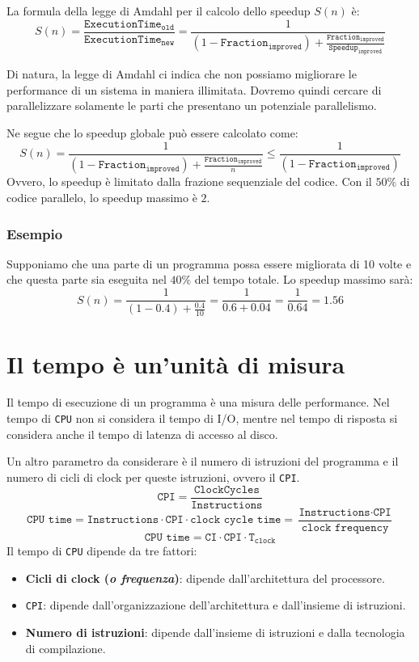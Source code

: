 La formula della legge di Amdahl per il calcolo dello
speedup \(S(n)\) è:
\[
  S(n) = \frac{\texttt{ExecutionTime}_{\texttt{old}}}
  {\texttt{ExecutionTime}_{\texttt{new}}}
  = \frac{1}{(1-\texttt{Fraction}_{\texttt{improved}})
  + \frac{\texttt{Fraction}_{\texttt{improved}}}
  {\texttt{Speedup}_{\texttt{improved}}}}
\]

Di natura, la legge di Amdahl ci indica che non possiamo
migliorare le performance di un sistema in maniera
illimitata. Dovremo quindi cercare di parallelizzare
solamente le parti che presentano un potenziale
parallelismo.

Ne segue che lo speedup globale può essere calcolato come:
\[
  S(n) = \frac{1}{(1-\texttt{Fraction}_{\texttt{improved}})
  + \frac{\texttt{Fraction}_{\texttt{improved}}}{n}} \leq 
    \frac{1}{(1-\texttt{Fraction}_{\texttt{improved}})}
\]
Ovvero, lo speedup è limitato dalla frazione sequenziale
del codice. Con il \(50\%\) di codice parallelo,
lo speedup massimo è \(2\).

\subsubsection{Esempio}

Supponiamo che una parte di un programma possa essere
migliorata di 10 volte e che questa parte sia eseguita
nel \(40\%\) del tempo totale. Lo speedup massimo sarà:
\[
  S(n) = \frac{1}{(1-0.4) + \frac{0.4}{10}} =
  \frac{1}{0.6 + 0.04} = \frac{1}{0.64} = 1.56
\]

\section{Il tempo è un'unità di misura}
Il tempo di esecuzione di un programma è una misura
delle performance. 
Nel tempo di \texttt{CPU} non si considera il tempo di
I/O, mentre nel tempo di risposta si considera anche il 
tempo di latenza di accesso al disco.

Un altro parametro da considerare è il numero di istruzioni
del programma e il numero di cicli di clock per queste istruzioni,
ovvero il \texttt{CPI}.
\[
  \texttt{CPI} = \frac{\texttt{ClockCycles}}{\texttt{Instructions}}  
\]
\[
  \texttt{CPU time} = \texttt{Instructions} \cdot \texttt{CPI} \cdot \texttt{clock cycle time}
  = \frac{\texttt{Instructions} \cdot \texttt{CPI}}{\texttt{clock frequency}}
\]
\[
  \texttt{CPU time} = \texttt{CI} \cdot \texttt{CPI} \cdot \texttt{T}_\texttt{clock}
\]
Il tempo di \texttt{CPU} dipende da tre fattori:
\begin{itemize}
  \item \textbf{Cicli di clock (\textit{o frequenza})}: dipende 
  dall'architettura del processore.
  \item \texttt{CPI}: dipende dall'organizzazione dell'architettura e 
  dall'insieme di istruzioni.
  \item \textbf{Numero di istruzioni}: dipende dall'insieme di istruzioni
  e dalla tecnologia di compilazione.
\end{itemize}

